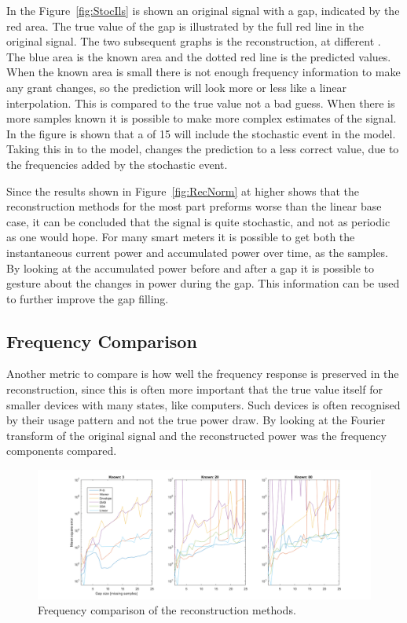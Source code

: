 In the Figure~\ref{fig:StocIls} is shown an original signal with a gap, indicated by the red area. The true value of the gap is illustrated by the full red line in the original signal. The two subsequent graphs is the reconstruction, at different . The blue area is the known area and the dotted red line is the predicted values. When the known area is small there is not enough frequency information to make any grant changes, so the prediction will look more or less like a linear interpolation. This is compared to the true value not a bad guess. When there is more samples known it is possible to make more complex estimates of the signal. In the figure is shown that a  of 15 will include the stochastic event in the model. Taking this in to the model, changes the prediction to a less correct value, due to the frequencies added by the stochastic event. 

Since the results shown in Figure~\ref{fig:RecNorm} at higher  shows that the reconstruction methods for the most part preforms worse than the linear base case, it can be concluded that the signal is quite stochastic, and not as periodic as one would hope. For many smart meters it is possible to get both the instantaneous current power and accumulated power over time, as the samples. By looking at the accumulated power before and after a gap it is possible to gesture about the changes in power during the gap. This information can be used to further improve the gap filling. 

\newpage

\subsection{Frequency Comparison}
Another metric to compare is how well the frequency response is preserved in the reconstruction, since this is often more important that the true value itself for smaller devices with many states, like computers. Such devices is often recognised by their usage pattern and not the true power draw. By looking at the Fourier transform of the original signal and the reconstructed power was the frequency components compared. 

\begin{figure}[H]
\centering
\includegraphics[width=1\textwidth]{billeder/RecFeq.png}
\caption{Frequency comparison of the reconstruction methods.}
\label{fig:RecFeq}
\end{figure}

